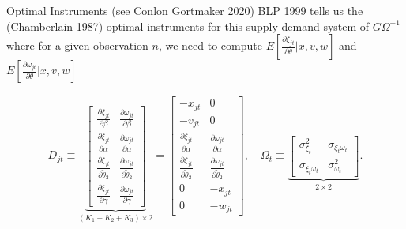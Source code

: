 \documentclass[xcolor=pdftex,dvipsnames,table,mathserif,aspectratio=169]{beamer}
\begin{document}
\begin{frame}{Optimal Instruments (see Conlon Gortmaker 2020)}
\noindent BLP 1999 tells us the (Chamberlain 1987) optimal instruments for this supply-demand system of $G\Omega^{-1}$ where for a given observation $n$, we need to compute $E[\frac{\partial \xi_{jt}}{\partial \theta} | x, v, w]$ and $E[\frac{\partial \omega_{jt}}{\partial \theta} | x, v, w]$

\begin{align*}
    D_{jt} \equiv \underbrace{
        \begin{bmatrix}
            \frac{\partial \xi_{jt}}{\partial \beta}
            & \frac{\partial \omega_{jt}}{\partial \beta} \\
            \frac{\partial \xi_{jt}}{\partial \alpha}
            & \frac{\partial \omega_{jt}}{\partial \alpha} \\
            \frac{\partial \xi_{jt}}{\partial \widetilde{\theta}_2}
            & \frac{\partial \omega_{jt}}{\partial \widetilde{\theta}_2} \\
            \frac{\partial \xi_{jt}}{\partial \gamma} 
            & \frac{\partial \omega_{jt}}{\partial \gamma} 
        \end{bmatrix}
    }_{(K_1 + K_2 + K_3)\times 2}
    = 
    \begin{bmatrix}
        -x_{jt} & 0 \\
        -v_{jt} & 0 \\
        \frac{\partial \xi_{jt}}{\partial \alpha}  
        &  \frac{\partial \omega_{jt}}{\partial \alpha}\\
        \frac{\partial \xi_{jt}}{\partial \widetilde{\theta}_2} 
        & \frac{\partial \omega_{jt}}{\partial \widetilde{\theta}_2} \\
        0 & -x_{jt} \\
        0 & -w_{jt}
    \end{bmatrix}
    , \quad \Omega_t \equiv 
    \underbrace{
        \begin{bmatrix}
        \sigma^2_{\xi_t} & \sigma_{\xi_t \omega_t}\\
        \sigma_{\xi_t \omega_t} & \sigma^2_{\omega_t}
    \end{bmatrix}
    }_{2 \times 2}.
\end{align*}
\end{frame}
\end{document}

